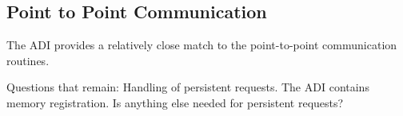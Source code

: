 \documentclass{article}
\begin{document}
\subsubsection{}
\subsubsection{}

\subsection{Point to Point Communication}

The ADI provides a relatively close match to the point-to-point
communication routines.  

Questions that remain:  Handling of persistent requests.  The ADI
contains memory registration.  Is anything else needed for persistent
requests? 

\subsubsection{}
\subsubsection{}
\subsubsection{}
\subsubsection{}
\subsubsection{}
\subsubsection{}
\subsubsection{}
\subsubsection{}
\end{document}
